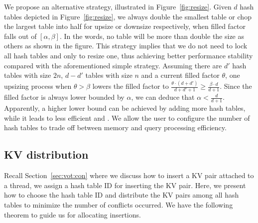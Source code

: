 We propose an alternative strategy, illustrated in Figure~\ref{fig:resize}. 
Given $d$ hash tables depicted in Figure~\ref{fig:resize},
we always double the smallest table or chop the largest table into half for upsize or downsize respectively, when filled factor falls out of $[\alpha,\beta]$. 
In the words, no table will be more than double the size as others as shown in the figure. This strategy implies that we do not need to lock all hash tables and only to resize one, thus achieving better performance stability compared with the aforementioned simple strategy. 
Assuming there are $d'$ hash tables with size $2n$, $d-d'$ tables with size $n$ and a current filled factor $\theta$, 
one upsizing process when $\theta > \beta$ lowers the filled factor to $\frac{\theta\cdot(d+d')}{d+d'+1} \geq \frac{\beta \cdot d}{d+1}$.  
Since the filled factor is always lower bounded by $\alpha$, we can deduce that $\alpha < \frac{d}{d+1}$.
Apparently, a higher lower bound can be achieved by adding more hash tables, while it leads to less efficient  and . 
We allow the user to configure the number of hash tables to trade off between memory and query processing efficiency. 

\subsection{KV distribution}\label{sec:dyn:distribute}
Recall Section~\ref{sec:vot:con} where we discuss how to insert a KV pair attached to a thread, 
we assign a hash table ID for inserting the KV pair.
Here, we present how to choose the hash table ID and distribute the KV pairs among all hash tables to minimize the number of conflicts occurred.
We have the following theorem to guide us for allocating insertions. 

